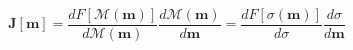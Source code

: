\begin{equation}
    \mathbf{J}[\mathbf{m}] = \frac{d F[\mathcal{M}(\mathbf{m})]}{d \mathcal{M}(\mathbf{m})}\frac{d \mathcal{M}(\mathbf{m})}{d \mathbf{m}} = \frac{d F[\sigma(\mathbf{m})]}{d \sigma}\frac{d \sigma}{d \mathbf{m}}
\label{eq:sensitivity_mappings}
\end{equation}
